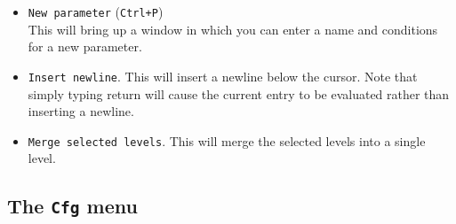 \documentclass[a4paper,11pt]{book}
\begin{document}
\begin{itemize}
  \item \texttt{New parameter} (\texttt{Ctrl+P})\\
  This will bring up a window in which you can enter a name and
  conditions for a new parameter.

  \item \texttt{Insert newline}.
  This will insert a newline below the cursor.  Note that simply
  typing return will cause the current entry to be evaluated rather
  than inserting a newline.

  \item \texttt{Merge selected levels}.
  This will merge the selected levels into a single level.
\end{itemize}

\subsection{The \texttt{Cfg} menu}
\end{document}
